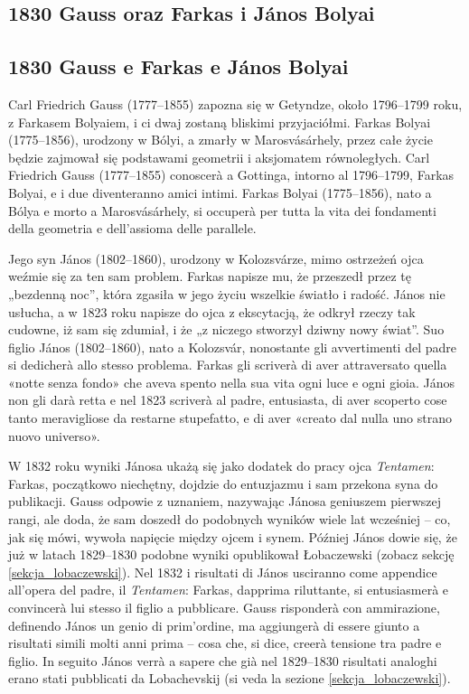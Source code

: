 \subsection{1830 Gauss oraz Farkas i János Bolyai} %
\subsection{1830 Gauss e Farkas e János Bolyai} %
\label{sekcja_gauss_bolyai}

Carl Friedrich Gauss (1777--1855) zapozna się w Getyndze, około 1796--1799 roku, z Farkasem Bolyaiem, i ci dwaj zostaną bliskimi przyjaciółmi. %
Farkas Bolyai (1775--1856), urodzony w Bólyi, a zmarły w Marosvásárhely, przez całe życie będzie zajmował się podstawami geometrii i aksjomatem równoległych. %
Carl Friedrich Gauss (1777--1855) conoscerà a Gottinga, intorno al 1796--1799, Farkas Bolyai, e i due diventeranno amici intimi. %
Farkas Bolyai (1775--1856), nato a Bólya e morto a Marosvásárhely, si occuperà per tutta la vita dei fondamenti della geometria e dell'assioma delle parallele. %
%
%

Jego syn János (1802--1860), urodzony w Kolozsvárze, mimo ostrzeżeń ojca weźmie się za ten sam problem. %
Farkas napisze mu, że przeszedł przez tę „bezdenną noc'', która zgasiła w jego życiu wszelkie światło i radość. %
János nie usłucha, a w 1823 roku napisze do ojca z ekscytacją, że odkrył rzeczy tak cudowne, iż sam się zdumiał, i że „z niczego stworzył dziwny nowy świat''. %
Suo figlio János (1802--1860), nato a Kolozsvár, nonostante gli avvertimenti del padre si dedicherà allo stesso problema. %
Farkas gli scriverà di aver attraversato quella «notte senza fondo» che aveva spento nella sua vita ogni luce e ogni gioia. %
János non gli darà retta e nel 1823 scriverà al padre, entusiasta, di aver scoperto cose tanto meravigliose da restarne stupefatto, e di aver «creato dal nulla uno strano nuovo universo». %
%

W 1832 roku wyniki Jánosa ukażą się jako dodatek do pracy ojca \emph{Tentamen}: Farkas, początkowo niechętny, dojdzie do entuzjazmu i sam przekona syna do publikacji. %
Gauss odpowie z uznaniem, nazywając Jánosa geniuszem pierwszej rangi, ale doda, że sam doszedł do podobnych wyników wiele lat wcześniej -- co, jak się mówi, wywoła napięcie między ojcem i synem. %
Później János dowie się, że już w latach 1829--1830 podobne wyniki opublikował Łobaczewski (zobacz sekcję \ref{sekcja_lobaczewski}). %
Nel 1832 i risultati di János usciranno come appendice all'opera del padre, il \emph{Tentamen}: Farkas, dapprima riluttante, si entusiasmerà e convincerà lui stesso il figlio a pubblicare. %
Gauss risponderà con ammirazione, definendo János un genio di prim'ordine, ma aggiungerà di essere giunto a risultati simili molti anni prima -- cosa che, si dice, creerà tensione tra padre e figlio. %
In seguito János verrà a sapere che già nel 1829--1830 risultati analoghi erano stati pubblicati da Lobachevskij (si veda la sezione \ref{sekcja_lobaczewski}). %

